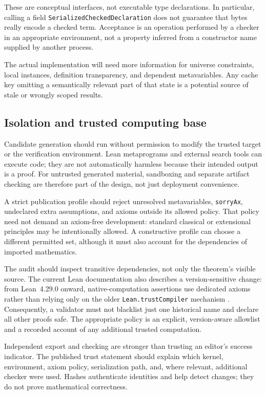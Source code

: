 \documentclass[11pt,a4paper]{article}
\newcommand{\code}[1]{\texttt{\small #1}}
\theoremstyle{definition}
\theoremstyle{remark}
\begin{document}
These are conceptual interfaces, not executable type declarations. In particular, calling a field \code{SerializedCheckedDeclaration} does not guarantee that bytes really encode a checked term. Acceptance is an operation performed by a checker in an appropriate environment, not a property inferred from a constructor name supplied by another process.

The actual implementation will need more information for universe constraints, local instances, definition transparency, and dependent metavariables. Any cache key omitting a semantically relevant part of that state is a potential source of stale or wrongly scoped results.

\subsection{Isolation and trusted computing base}
Candidate generation should run without permission to modify the trusted target or the verification environment. Lean metaprograms and external search tools can execute code; they are not automatically harmless because their intended output is a proof. For untrusted generated material, sandboxing and separate artifact checking are therefore part of the design, not just deployment convenience.

A strict publication profile should reject unresolved metavariables, \code{sorryAx}, undeclared extra assumptions, and axioms outside its allowed policy. That policy need not demand an axiom-free development: standard classical or extensional principles may be intentionally allowed. A constructive profile can choose a different permitted set, although it must also account for the dependencies of imported mathematics.

The audit should inspect transitive dependencies, not only the theorem's visible source. The current Lean documentation also describes a version-sensitive change: from Lean~4.29.0 onward, native-computation assertions use dedicated axioms rather than relying only on the older \code{Lean.trustCompiler} mechanism \cite{lean-validation}. Consequently, a validator must not blacklist just one historical name and declare all other proofs safe. The appropriate policy is an explicit, version-aware allowlist and a recorded account of any additional trusted computation.

Independent export and checking are stronger than trusting an editor's success indicator. The published trust statement should explain which kernel, environment, axiom policy, serialization path, and, where relevant, additional checker were used. Hashes authenticate identities and help detect changes; they do not prove mathematical correctness.
\end{document}
